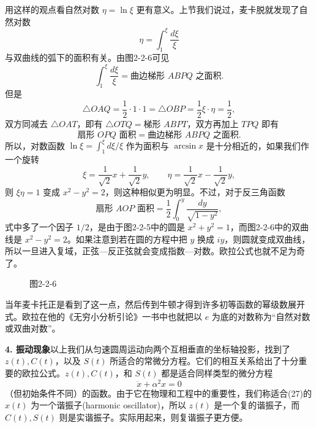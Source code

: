 用这样的观点看自然对数 $\eta=\ln\xi$ 更有意义。上节我们说过，麦卡脱就发现了自然对数
\[
\eta=\int_1^\xi\frac{d\xi}{\xi}
\]
与双曲线的弧下的面积有关。由图2-2-6可见
\[
\int_1^\xi\frac{d\xi}{\xi}=\text{曲边梯形 }ABPQ\text{ 之面积}.
\]
但是
\[
\triangle OAQ=\frac12\cdot1\cdot1=\triangle OBP=\frac12\xi\cdot\eta=\frac12,
\]
双方同减去 $\triangle OAT$，即有 $\triangle OTQ=\text{梯形 }ABPT$，双方再加上 $TPQ$ 即有
\[
\text{扇形 }OPQ\text{ 面积}=\text{曲边梯形 }ABPQ\text{ 之面积}.
\]
所以，对数函数 $\ln\xi=\int_1^\xi d\xi/\xi$ 作为面积与 $\arcsin x$ 是十分相近的，如果我们作一个旋转
\[
\xi=\frac1{\sqrt2}x+\frac1{\sqrt2}y,
\qquad
\eta=\frac1{\sqrt2}x-\frac1{\sqrt2}y,
\]
则 $\xi\eta=1$ 变成 $x^2-y^2=2$，则这种相似更为明显。不过，对于反三角函数
\[
\text{扇形 }AOP\text{ 面积}=\frac12\int_0^y\frac{dy}{\sqrt{1-y^2}},
\]
式中多了一个因子 $1/2$，是由于图2-2-5中的圆是 $x^2+y^2=1$，而图2-2-6中的双曲线是 $x^2-y^2=2$。如果注意到若在圆的方程中把 $y$ 换成 $iy$，则圆就变成双曲线，所以一旦进入复域，正弦—反正弦就会变成指数—对数。欧拉公式也就不足为奇了。

\begin{figure}[htbp]
\centering
{}
\caption*{图2-2-6}
\end{figure}

当年麦卡托正是看到了这一点，然后传到牛顿才得到许多初等函数的幂级数展开式。欧拉在他的《无穷小分析引论》一书中也就把以 $e$ 为底的对数称为“自然对数或双曲对数”。

\textbf{4. 振动现象}\quad 以上我们从匀速圆周运动向两个互相垂直的坐标轴投影，找到了 $z(t),C(t)$，以及 $S(t)$ 所适合的常微分方程。它们的相互关系给出了十分重要的欧拉公式。$z(t),C(t)$，和 $S(t)$ 都是适合同样类型的微分方程
\[
\ddot x+\alpha^2x=0 \tag{27}
\]
（但初始条件不同）的函数。由于它在物理和工程中的重要性，我们称适合(27)的 $x(t)$ 为一个谐振子(harmonic oscillator)，所以 $z(t)$ 是一个复的谐振子，而 $C(t),S(t)$ 则是实谐振子。实际用起来，则复谐振子更方便。

